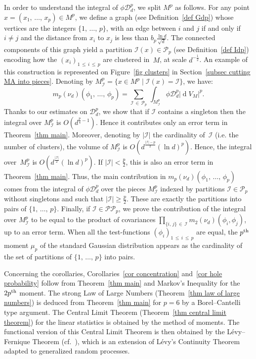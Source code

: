 \documentclass[10pt]{amsart}
\theoremstyle{definition}\newtheorem{defi}[theo]{Definition}\newtheorem{rema}[theo]{Remark}\newtheorem{exam}[theo]{Example}\newtheorem{exem}[theo]{Example}\newtheorem{nota}[theo]{Notation}
\DeclareMathOperator{\dmesure}{d}
\newcommand{\D}{\mathcal{D}}
\newcommand{\I}{\mathcal{I}}
\newcommand{\pa}{\mathcal{P}\!}
\newcommand{\pp}{\mathcal{P\!P}\!}
\newcommand{\norm}[1]{\left\lvert #1 \right\rvert}
\newcommand{\rmes}[1]{\norm{\dmesure\! V_{#1}}}
\renewcommand{\geq}{\geqslant}
\renewcommand{\leq}{\leqslant}
\begin{document}
In order to understand the integral of $\phi\D^p_d$, we split $M^p$ as follows. For any point $x=(x_1,\,\dots,\,x_p) \in M^p$, we define a graph (see Definition~\ref{def Gdp}) whose vertices are the integers $\{1,\,\dots,\,p\}$, with an edge between $i$ and $j$ if and only if $i \neq j$ and the distance from $x_i$ to $x_j$ is less than $b_p \tfrac{\ln d}{\sqrt{d}}$. The connected components of this graph yield a partition $\I(x) \in \pa_p$ (see Definition~\ref{def Idp}) encoding how the $(x_i)_{1\,\leq\,i\,\leq\, p}$ are clustered in~$M$, at scale $d^{-\frac{1}{2}}$. An example of this construction is represented on Figure~\ref{fig clusters} in Section~\ref{subsec cutting MA into pieces}. Denoting by $M^p_\I = \{ x \in M^p \mid \I(x)=\I\}$, we have:
\[
m_p(\nu_d)(\phi_1,\,\dots,\,\phi_p) = \sum_{\I\,\in\,\pa_p}\,\int_{M^p_\I} \phi \D_d^p \rmes{M}^p.
\]
Thanks to our estimates on $\D^p_d$, we show that if $\I$ contains a singleton then the integral over $M^p_\I$ is $O(d^{\frac{p}{4}-1})$. Hence it contributes only an error term in Theorem~\ref{thm main}. Moreover, denoting by $|\I|$ the cardinality of~$\I$ (i.e. the number of clusters), the volume of $M^p_\I$ is $O(d^\frac{|\I|-p}{2}(\ln d)^{p})$. Hence, the integral over~$M^p_\I$ is $O(d^\frac{|\I|}{2}(\ln d)^p)$. If $|\I| < \frac{p}{2}$, this is also an error term in Theorem~\ref{thm main}. Thus, the main contribution in $m_p(\nu_d)(\phi_1,\,\dots,\,\phi_p)$ comes from the integral of $\phi \D^p_d$ over the pieces $M^p_\I$ indexed by partitions $\I \in \pa_p$ without singletons and such that $|\I| \geq \frac{p}{2}$. These are exactly the partitions into pairs of $\{1,\,\dots,\,p\}$. Finally, if $\I\in \pp_p$, we prove the contribution of the integral over $M^p_\I$ to be equal to the product of covariances $\prod_{\{i,\,j\}\,\in\,\I} m_2(\nu_d)(\phi_i,\phi_j)$, up to an error term. When all the test-functions $(\phi_i)_{1\,\leq\,i\,\leq\,p}$ are equal, the $p^{\rm th}$ moment $\mu_p$ of the standard Gaussian distribution appears as the cardinality of the set of partitions of $\{1,\,\dots,\,p\}$ into pairs.

Concerning the corollaries, Corollaries~\ref{cor concentration} and~\ref{cor hole probability} follow from Theorem~\ref{thm main} and Markov's Inequality for the $2p^{\rm th}$ moment. The strong Law of Large Numbers (Theorem~\ref{thm law of large numbers}) is deduced from Theorem~\ref{thm main} for $p=6$ by a Borel--Cantelli type argument. The Central Limit Theorem (Theorem~\ref{thm central limit theorem}) for the linear statistics is obtained by the method of moments. The functional version of this Central Limit Theorem is then obtained by the Lévy--Fernique Theorem (cf.~\cite{Fer1967}), which is an extension of Lévy's Continuity Theorem adapted to generalized random processes.
\end{document}
